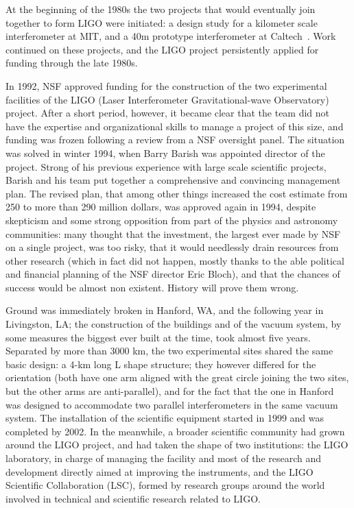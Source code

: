 At the beginning of the 1980s the two projects that would eventually join together to form LIGO were initiated: 
a design study for a kilometer scale interferometer at MIT, and a 40m 
prototype interferometer at Caltech~\cite{caltech40m}. Work continued on these projects, and the LIGO project persistently applied for funding through the late 1980s.

In 1992, NSF approved funding for the construction of the two experimental facilities of the LIGO (Laser Interferometer Gravitational-wave Observatory) project.
After a short period, however, it became clear that the team did not have the expertise and organizational skills to manage a project of this size, and funding was frozen following a review from a NSF oversight panel.
The situation was solved in winter 1994, when Barry Barish was appointed director of the project. Strong of his previous experience with large scale scientific projects, Barish and his team put together a comprehensive and convincing management plan.
The revised plan, that among other things increased the cost estimate from 250 to more than 290 million dollars, was approved again in 1994, despite skepticism and some strong opposition from part of the physics and astronomy communities:
many thought that the investment, the largest ever made by NSF on a  single project, was too risky, that it would needlessly drain resources from other research (which in fact did not happen, mostly thanks to the able political and financial planning of the NSF director Eric Bloch), and that the chances of success would be almost non existent.
History will prove them wrong.

Ground was immediately broken in Hanford, WA, and the following year in Livingston, LA; 
the construction of the buildings and of the vacuum system, by some measures the biggest 
ever built at the time, took almost five years. Separated by more than 3000 km, the two 
experimental sites shared the same basic design: a 4-km long L shape structure; they 
however differed for the orientation (both have one arm aligned with the great circle joining the two sites, but the other arms are anti-parallel), and for the fact that the one in Hanford was 
designed to accommodate two parallel interferometers in the same vacuum system. 
The installation of the scientific equipment started in 1999 and was completed by 2002. 
In the meanwhile, a broader scientific community had grown around the LIGO project, 
and had taken the shape of two institutions: the LIGO laboratory, in charge of managing 
the facility and most of the research and development directly aimed at improving the 
instruments, and the LIGO Scientific Collaboration (LSC), formed by research groups 
around the world involved in technical and scientific research related to LIGO.

